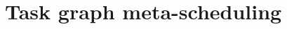 \documentclass[english,phd]{diploma}
\begin{document}
\MakeTitlePages

\printglossaries

\listoffigures
\clearpage

\listoftables
\clearpage

\lstlistoflistings
\clearpage

\nocite{estee, rsds, hyperqueue, ligate}

%
%
%
%
%
%
%
%
%
%
%
%
\chapter{Task graph meta-scheduling}
\label{ch:hyperqueue}


%
\end{document}
